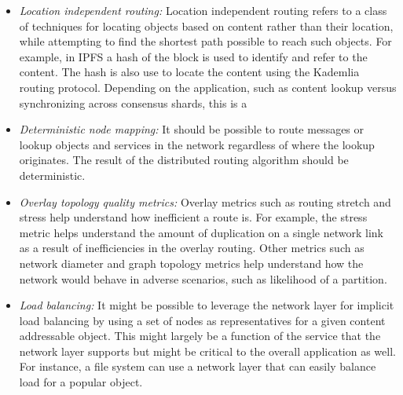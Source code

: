 \documentclass[journal]{IEEEtran}
\begin{document}
\begin{itemize}
    \item {\em Location independent routing:} Location independent routing refers to a class of techniques for locating objects based on content rather than
        their location, while attempting to find the shortest path possible to reach such objects. For example, in IPFS
        \cite{ipfs} a hash of the block is used to identify and refer to the content. The hash is also use to locate the
        content using the Kademlia routing protocol. Depending on the application, such as content lookup versus
        synchronizing across consensus shards, this is a

    \item {\em Deterministic node mapping:} It should be possible to route messages or lookup objects and services in the network regardless of where the
        lookup originates. The result of the distributed routing algorithm should be deterministic.

    \item {\em Overlay topology quality metrics:} Overlay metrics such as routing stretch and stress help understand how inefficient a route is. For example, the
        stress metric helps understand the amount of duplication on a single network link as a result of inefficiencies
        in the overlay routing. Other metrics such as network diameter and graph topology metrics help understand how
        the network would behave in adverse scenarios, such as likelihood of a partition.

    \item {\em Load balancing:} It might be possible to leverage the network layer for implicit load balancing by using a set of nodes as
        representatives for a given content addressable object. This might largely be a function of the service that the
        network layer supports but might be critical to the overall application as well. For instance, a file system can
        use a network layer that can easily balance load for a popular object.


\end{itemize}
\end{document}
